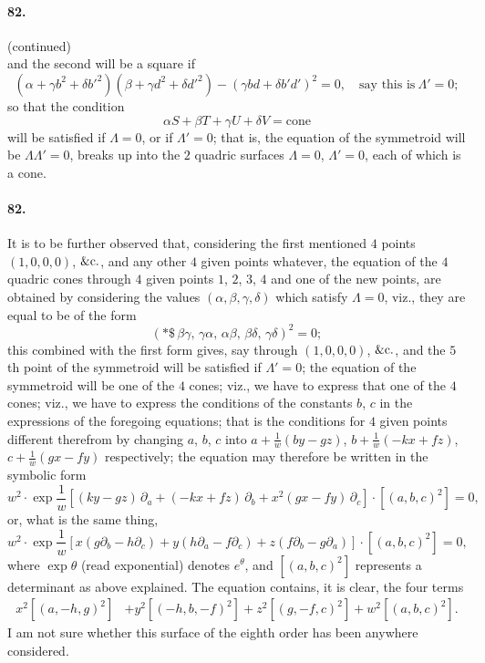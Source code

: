\documentclass[11pt,a4paper]{article}
\begin{document}
\paragraph{82.} (continued)\\
and the second will be a square if
\[
(\alpha + \gamma b^2 + \delta b'^2)(\beta + \gamma d^2 + \delta d'^2)
- (\gamma b d + \delta b' d')^2 = 0,\quad \text{say this is}\ \Lambda' = 0;
\]
so that the condition
\[
\alpha S + \beta T + \gamma U + \delta V = \text{cone}
\]
will be satisfied if $\Lambda = 0$, or if $\Lambda' = 0$; that is, the equation of
the symmetroid will be $\Lambda\Lambda' = 0$, breaks up into the $2$ quadric surfaces
$\Lambda = 0$, $\Lambda' = 0$, each of which is a cone.

\medskip

\paragraph{82.}
It is to be further observed that, considering the first mentioned $4$ points
$(1, 0, 0, 0)$, $\&{\rm c}.$, and any other $4$ given points whatever, the equation of
the $4$ quadric cones through $4$ given points $1$, $2$, $3$, $4$ and one of the
new points, are obtained by considering the values $(\alpha, \beta, \gamma, \delta)$
which satisfy $\Lambda = 0$, viz., they are equal to be of the form
\[
(*\$\,\beta\gamma,\,\gamma\alpha,\,\alpha\beta,\,\beta\delta,\,\gamma\delta)^2 = 0;
\]
this combined with the first form gives, say through $(1, 0, 0, 0)$, $\&{\rm c}.$,
and the $5$th point of the symmetroid will be satisfied if $\Lambda' = 0$; the equation
of the symmetroid will be one of the $4$ cones; viz., we have to express that one of
the $4$ cones; viz., we have to express the conditions of the constants $b$, $c$ in
the expressions of the foregoing equations; that is the conditions for $4$ given
points different therefrom by changing $a$, $b$, $c$ into $a + \frac{1}{w}(by - gz)$,
$b + \frac{1}{w}(-kx + f z)$, $c + \frac{1}{w}(gx - fy)$ respectively; the equation
may therefore be written in the symbolic form
\[
w^2 \cdot \exp\!\frac{1}{w}\!\left[(ky - gz)\,\partial_a + (-kx + fz)\,\partial_b
+ x^2(gx - fy)\,\partial_c\right] \cdot [(a, b, c)^2] = 0,
\]
or, what is the same thing,
\[
w^2 \cdot \exp\!\frac{1}{w}\!\left[x(g\partial_b - h\partial_c) + y(h\partial_a - f\partial_c)
+ z(f\partial_b - g\partial_a)\right] \cdot [(a, b, c)^2] = 0,
\]
where $\exp\theta$ (read exponential) denotes $e^\theta$, and $[(a, b, c)^2]$
represents a determinant as above explained. The equation contains, it is clear, the
four terms
\begin{align*}
x^2[(a, -h, g)^2] &+ y^2[(-h, b, -f)^2] + z^2[(g, -f, c)^2] + w^2[(a, b, c)^2].
\end{align*}
I am not sure whether this surface of the eighth order has been anywhere considered.
\end{document}
